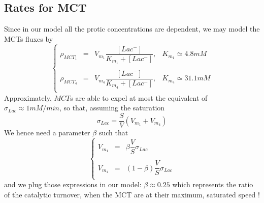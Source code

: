 \documentclass{revtex4}
\begin{document}
\subsection{Rates for MCT}
Since in our model all the protic concentrations are dependent, we may model the MCTs fluxes by
\begin{equation}
	\left\lbrace
	\begin{array}{rcll}
	\rho_{MCT_1} & = & V_{m_1} \dfrac{\left[Lac^-\right]}{K_{m_1}+\left[Lac^-\right]}, & K_{m_1}\simeq 4.8mM\\
	\\
	\rho_{MCT_4} & = & V_{m_4} \dfrac{\left[Lac^-\right]}{K_{m_4}+\left[Lac^-\right]}, & K_{m_4}\simeq 31.1mM\\
	\end{array}
	\right.
\end{equation}
Approximately, $MCT$s are able to expel at most the equivalent of $\sigma_{Lac}\approx 1mM/min$, so that, assuming the saturation
\begin{equation}
\sigma_{Lac} = \dfrac{S}{V}\left( V_{m_1} + V_{m_4} \right)
\end{equation}
We hence need a parameter $\beta$ such that
\begin{equation}
	\left\lbrace
	\begin{array}{rcr}
	V_{m_1} & = & \beta \dfrac{V}{S} \sigma_{Lac} \\
	\\
	V_{m_4} & = & (1-\beta) \dfrac{V}{S} \sigma_{Lac} \\
	\end{array}
	\right.
\end{equation}
and we plug those expressions in our model: $\beta\approx0.25$ which represents the ratio of the catalytic turnover, when
the MCT are at their maximum, saturated speed !
\end{document}
